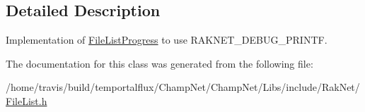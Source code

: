 \subsection{Detailed Description}
Implementation of \hyperlink{class_rak_net_1_1_file_list_progress}{File\-List\-Progress} to use R\-A\-K\-N\-E\-T\-\_\-\-D\-E\-B\-U\-G\-\_\-\-P\-R\-I\-N\-T\-F. 

The documentation for this class was generated from the following file\-:\begin{DoxyCompactItemize}
\item 
/home/travis/build/temportalflux/\-Champ\-Net/\-Champ\-Net/\-Libs/include/\-Rak\-Net/\hyperlink{_file_list_8h}{File\-List.\-h}\end{DoxyCompactItemize}
